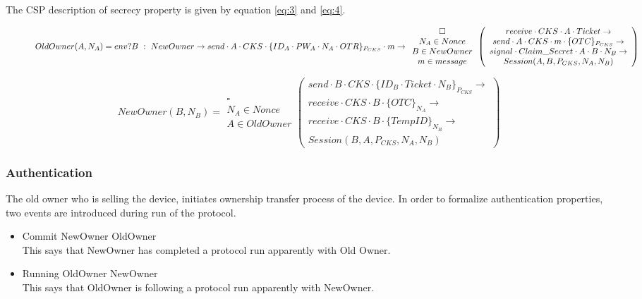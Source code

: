 \documentclass[letterpaper]{article}
\begin{document}
The CSP description of secrecy property is given by equation \eqref{eq:3} and \eqref{eq:4}.
\begin{figure*}[bpht!]
\begin{dmath}\label{eq:3}
OldOwner(A,N_{A})=env?B \ :\ NewOwner \rightarrow send \cdot A \cdot CKS \cdot \{ID_{A}\cdot PW_{A} \cdot N_{A} \cdot OTR\}_{P_{CKS}} \cdot m \rightarrow \\
\begin{array}{c} \square \\N_{A}\in Nonce \\ B \in NewOwner \\ m \in  message \end{array} \left(\begin{array}{c} receive \cdot CKS \cdot A \cdot Ticket \rightarrow \\ send \cdot A \cdot CKS \cdot m \cdot \{OTC\}_{P_{CKS}}\rightarrow \\ 
signal \cdot Claim\_Secret \cdot A \cdot B \cdot N_{B}\rightarrow \\
Session(A,B,P_{CKS},N_{A},N_{B})\end{array} \right)
\end{dmath}
\end{figure*}

\begin{figure*}[bpht!]
\begin{dmath}\label{eq:4}
NewOwner(B,N_{B})= \begin{array}{c} \square \\N_{A}\in Nonce \\ A\in OldOwner \end{array} \left(\begin{array}{c} send \cdot B \cdot CKS \cdot \{ID_{B} \cdot Ticket \cdot N_{B}\}_{P_{CKS}}     \rightarrow \\ receive \cdot CKS \cdot B \cdot \{OTC\}_{N_{A}} \rightarrow \\
receive\cdot CKS \cdot B \cdot  \{TempID\}_{N_{B}} \rightarrow \\ 
Session(B,A,P_{CKS},N_{A},N_{B})\end{array} \right)
\end{dmath}
\end{figure*}
\subsubsection{Authentication}
The old owner who is selling the device, initiates ownership transfer process of the device. In order to formalize authentication properties, two events are introduced during run of the protocol.\\
\begin{itemize}
\item Commit  NewOwner  OldOwner \\ 
This says that NewOwner has completed a protocol run apparently with Old Owner.\\
\item Running  OldOwner  NewOwner \\ 
This says that OldOwner is following a protocol run apparently with NewOwner.\\
\end{itemize}
 	
\end{document}
